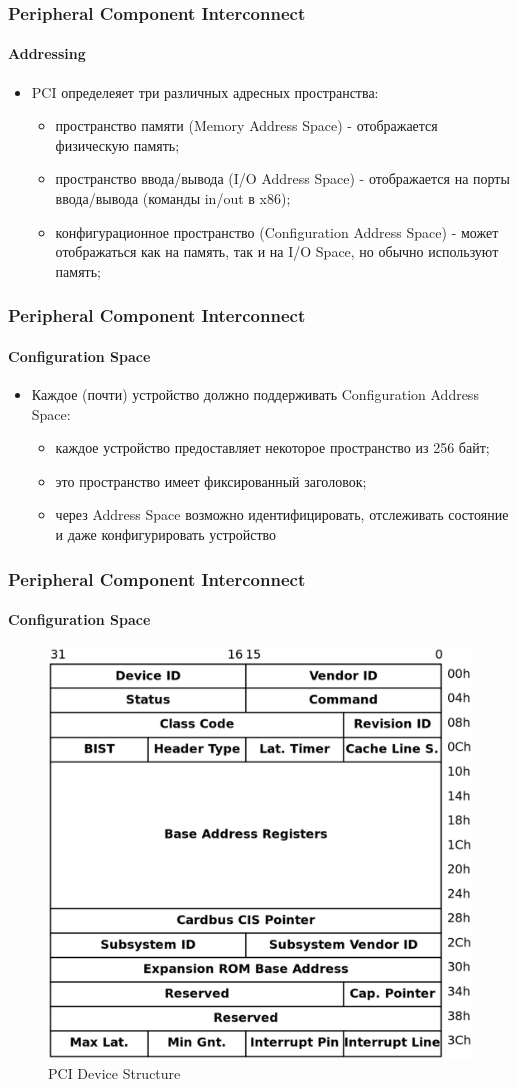 \begin{frame}
\frametitle{Peripheral Component Interconnect}
\framesubtitle{Addressing}
\begin{itemize}
  \item PCI определеяет три различных адресных пространства:
    \begin{itemize}
      \item пространство памяти (Memory Address Space) - отображается физическую
            память;
      \item пространство ввода/вывода (I/O Address Space) - отображается на
            порты ввода/вывода (команды in/out в x86);
      \item конфигурационное пространство (Configuration Address Space) - может
            отображаться как на память, так и на I/O Space, но обычно используют
            память;
    \end{itemize}
\end{itemize}
\end{frame}

\begin{frame}
\frametitle{Peripheral Component Interconnect}
\framesubtitle{Configuration Space}
\begin{itemize}
  \item Каждое (почти) устройство должно поддерживать Configuration Address
        Space:
    \begin{itemize}
      \item каждое устройство предоставляет некоторое пространство из 256 байт;
      \item это пространство имеет фиксированный заголовок;
      \item через Address Space возможно идентифицировать, отслеживать состояние
            и даже конфигурировать устройство
    \end{itemize}
\end{itemize}
\end{frame}

\begin{frame}
\frametitle{Peripheral Component Interconnect}
\framesubtitle{Configuration Space}
\begin{figure}
  \centering\includegraphics[width=.6\linewidth]{pci-config}
  \caption{PCI Device Structure}
\end{figure}
\end{frame}

